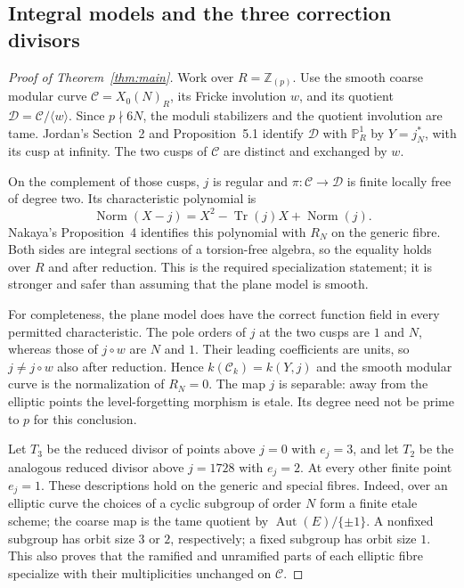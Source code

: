 \subsection{Integral models and the three correction divisors}
\begin{proof}[Proof of Theorem~\ref{thm:main}]
Work over $R=\mathbb Z_{(p)}$. Use the smooth coarse modular curve
$\mathcal C=X_0(N)_R$, its Fricke involution $w$, and its quotient
$\mathcal D=\mathcal C/\langle w\rangle$. Since $p\nmid6N$, the moduli stabilizers and the quotient involution are tame. Jordan's Section~2 and Proposition~5.1 identify $\mathcal D$ with $\mathbb P^1_R$ by $Y=j_N^*$, with its cusp at infinity. The two cusps of $\mathcal C$ are distinct and exchanged by $w$.

On the complement of those cusps, $j$ is regular and $\pi:\mathcal C\to\mathcal D$ is finite locally free of degree two. Its characteristic polynomial is
\[
 \operatorname{Norm}(X-j)=X^2-\operatorname{Tr}(j)X+\operatorname{Norm}(j).
\]
Nakaya's Proposition~4 identifies this polynomial with $R_N$ on the generic fibre. Both sides are integral sections of a torsion-free algebra, so the equality holds over $R$ and after reduction. This is the required specialization statement; it is stronger and safer than assuming that the plane model is smooth.

For completeness, the plane model does have the correct function field in every permitted characteristic. The pole orders of $j$ at the two cusps are $1$ and $N$, whereas those of $j\circ w$ are $N$ and $1$. Their leading coefficients are units, so $j\ne j\circ w$ also after reduction. Hence $k(\mathcal C_k)=k(Y,j)$ and the smooth modular curve is the normalization of $R_N=0$. The map $j$ is separable: away from the elliptic points the level-forgetting morphism is etale. Its degree need not be prime to $p$ for this conclusion.

Let $T_3$ be the reduced divisor of points above $j=0$ with $e_j=3$, and let $T_2$ be the analogous reduced divisor above $j=1728$ with $e_j=2$. At every other finite point $e_j=1$. These descriptions hold on the generic and special fibres. Indeed, over an elliptic curve the choices of a cyclic subgroup of order $N$ form a finite etale scheme; the coarse map is the tame quotient by $\operatorname{Aut}(E)/\{\pm1\}$. A nonfixed subgroup has orbit size $3$ or $2$, respectively; a fixed subgroup has orbit size $1$. This also proves that the ramified and unramified parts of each elliptic fibre specialize with their multiplicities unchanged on $\mathcal C$.


\end{proof}
